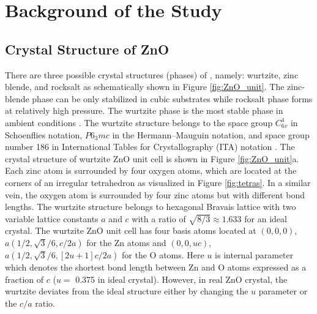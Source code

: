 \chapter{Background of the Study} \label{chap:rrl}
\section{Crystal Structure of ZnO}
There are three possible crystal structures (phases) of , namely: wurtzite, zinc blende, and rocksalt as schematically shown in Figure \ref{fig:ZnO_unit}. The zinc-blende phase can be only stabilized in cubic substrates while rocksalt phase forms at relatively high pressure. The wurtzite phase is the most stable phase in ambient conditions \citep{Oezguer2005}. The wurtzite structure belongs to the space group $C^4_{6v}$ in Schoenflies notation, $P6_3mc$ in the  Hermann–Mauguin notation, and space group number 186 in International Tables for Crystallography (ITA) notation \citep{Hahn2005}. The crystal structure of wurtzite ZnO unit cell is shown in Figure \ref{fig:ZnO_unit}a. Each zinc atom is surrounded by four oxygen atoms, which are located at the corners of an irregular tetrahedron as visualized in Figure \ref{fig:tetras}. In a similar vein, the oxygen atom is surrounded by four zinc atoms but with different bond lengths. The wurtzite structure belongs to hexagonal Bravais lattice with two variable lattice constants $a$ and $c$ with a ratio of $\sqrt{8/3} \approx 1.633$ for an ideal crystal.  The wurtzite ZnO unit cell has four basis atoms located at $(0,0,0)$, $a(1/2,\sqrt{3}/6,c/2a)$ for the Zn atoms
and $(0,0,uc)$, $a(1/2,\sqrt{3}/6,[2u+1]c/2a)$ for the O atoms.
Here  $u$ is internal parameter which denotes the shortest bond length between Zn and O atoms expressed as a fraction of $c$ ($u=$ 0.375 in  ideal crystal). However, in real ZnO crystal, the wurtzite deviates from the ideal structure either by changing the $u$ parameter or the $c/a$ ratio.

